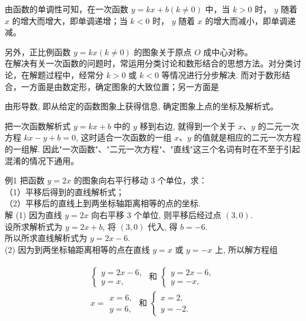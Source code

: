 \documentclass[10pt]{article}
\begin{document}
由函数的单调性可知，在一次函数 $y=k x+b(k \neq 0)$ 中，当 $k>0$ 时， $y$ 随着 $x$ 的增大而增大，即单调递增；当 $k<0$ 时， $y$ 随着 $x$ 的增大而减小，即单调递减。

另外，正比例函数 $y=k x(k \neq 0)$ 的图象关于原点 $O$ 成中心对称。\\
在解决有关一次函数的问题时，常运用分类讨论和数形结合的思想方法。对分类讨论，在解题过程中，经常分 $k>0$ 或 $k<0$ 等情况进行分步解决. 而对于数形结合，一方面是由数定形，确定图象的大致位置；另一方面是

由形导数, 即从给定的函数图象上获得信息, 确定图象上点的坐标及解析式。

把一次函数解析式 $y=k x+b$ 中的 $y$ 移到右边, 就得到一个关于 $x 、 y$ 的二元一次方程 $k x-y+b=0$, 这时适合一次函数的一组 $x 、 y$ 的值就是相应的二元一次方程的一组解. 因此"一次函数"、"二元一次方程"、"直线"这三个名词有时在不至于引起混淆的情况下通用。

例1 把函数 $y=2 x$ 的图象向右平行移动 3 个单位，求：\\
（1）平移后得到的直线解析式；\\
（2）平移后的直线上到两坐标轴距离相等的点的坐标.\\
解 (1) 因为直线 $y=2 x$ 向右平移 3 个单位, 则平移后经过点 $(3,0)$.\\
设所求解析式为 $y=2 x+b$, 将 $(3,0)$ 代入, 得 $b=-6$.\\
所以所求直线解析式为 $y=2 x-6$.\\
(2) 因为到两坐标轴距离相等的点在直线 $y=x$ 或 $y=-x$ 上, 所以解方程组

\begin{align*}
\begin{gathered}
\left\{\begin{array} { l } 
{ y = 2 x - 6 , } \\
{ y = x , }
\end{array} \text { 和 } \left\{\begin{array}{l}
y=2 x-6, \\
y=-x,
\end{array}\right.\right. \\
x=\begin{array}{l}
x=6, \\
y=6,
\end{array} \text { 和 }\left\{\begin{array}{l}
x=2, \\
y=-2 .
\end{array}\right.
\end{gathered}
\end{align*}
\end{document}
